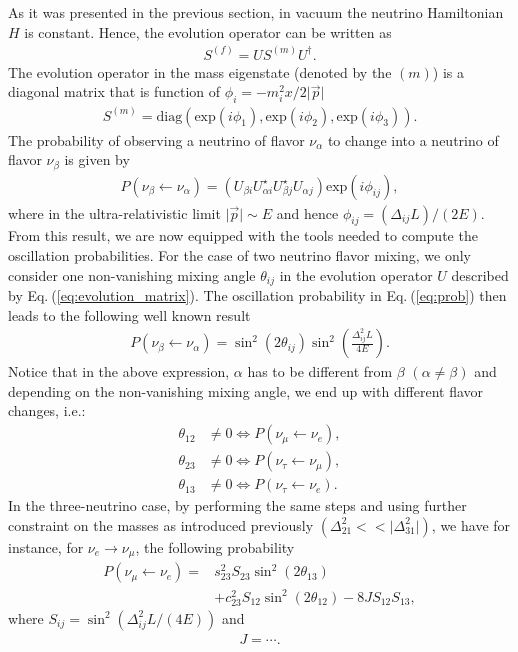 \documentclass[twocolumn,secnumarabic,amssymb, nobibnotes, aps, prd,10pt]{revtex4-1}
\newcommand{\Eq}[1]{Eq.$\:$(\ref{#1})}
\begin{document}
As it was presented in the previous section, in vacuum the neutrino Hamiltonian $H$ is
constant. Hence, the evolution operator can be written as
\begin{align}
S^{(f)} = U S^{(m)} U^\dagger .
\end{align}
The evolution operator in the mass eigenstate (denoted by the $(m)$) is a diagonal matrix
that is function of $\phi_i = -m_i^2 x / 2 \vert \vec{p} \vert$
\begin{align}
S^{(m)} = \mathrm{diag} \left( \mathrm{exp}(i \phi_1), \mathrm{exp}(i \phi_2), 
\mathrm{exp}(i \phi_3) \right) .
\end{align}
The probability of observing a neutrino of flavor $\nu_\alpha$ to change into a neutrino
of flavor $\nu_\beta$ is given by
\begin{align}
P (\nu_\beta \longleftarrow \nu_\alpha) = \left( U_{\beta i} U^\star_{\alpha i} 
U^\star_{\beta j} U_{\alpha j} \right) \mathrm{exp}(i \phi_{ij}),
\label{eq:prob}
\end{align}
where in the ultra-relativistic limit $\vert \vec{p} \vert \sim E$ and hence
$\phi_{ij} = \left( \Delta_{ij} L \right) / (2 E)$.
From this result, we are now equipped with the tools needed to compute the oscillation
probabilities. For the case of two neutrino flavor mixing, we only consider one 
non-vanishing mixing angle $\theta_{ij}$ in the evolution operator $U$ described
by \Eq{eq:evolution_matrix}. The oscillation probability in \Eq{eq:prob} then leads
to the following well known result
\begin{align}
P (\nu_\beta \longleftarrow \nu_\alpha) = \sin^2 (2 \theta_{ij}) \sin^2 \left(
\frac{\Delta_{ij}^2 L}{4 E} \right) .
\label{eq:2OscProb}
\end{align}
Notice that in the above expression, $\alpha$ has to be different from $\beta$ 
$(\alpha \neq \beta)$ and depending on the non-vanishing mixing angle, we end up with
different flavor changes, i.e.:
\begin{align}
\theta_{12} & \neq 0 \Longleftrightarrow P (\nu_\mu \longleftarrow \nu_e), \\
\theta_{23} & \neq 0 \Longleftrightarrow P (\nu_\tau \longleftarrow \nu_\mu), \\
\theta_{13} & \neq 0 \Longleftrightarrow P (\nu_\tau \longleftarrow \nu_e) .
\end{align}
In the three-neutrino case, by performing the same steps and using further constraint
on the masses as introduced previously $(\Delta_{21}^2 << \vert \Delta_{31}^2 \vert)$,
we have for instance, for $\nu_e \longrightarrow \nu_\mu$, the following probability
\begin{align}
P (\nu_\mu \longleftarrow \nu_e) =& s_{23}^{2} S_{23} \sin^2 (2 \theta_{13})  \nonumber \\
& + c_{23}^{2} S_{12} \sin^2(2 \theta_{12}) - 8 J S_{12} S_{13} ,
\end{align} 
where $S_{ij} = \sin^2 \left( \Delta_{ij}^2 L / (4E) \right)$ and 
\begin{align}
J = \cdots .
\end{align}
\end{document}
